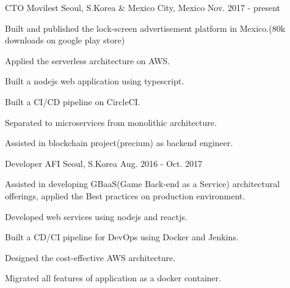 

\begin{cventries}

  \cventry
    {CTO} %
    {Movilest} %
    {Seoul, S.Korea \& Mexico City, Mexico} %
    {Nov. 2017 - present} %
    {
      \begin{cvitems} %
        \item {Built and published the lock-screen advertisement platform in Mexico.(80k downloads on google play store)}
        \item {Applied the serverless architecture on AWS.}
        \item {Built a nodejs web application using typescript.}
        \item {Built a CI/CD pipeline on CircleCI.}
        \item {Separated to microservices from monolithic architecture.}
        \item {Assisted in blockchain project(precium) as backend engineer.}
      \end{cvitems}
    }

  \cventry
    {Developer} %
    {AFI} %
    {Seoul, S.Korea} %
    {Aug. 2016 - Oct. 2017} %
    {
      \begin{cvitems} %
        \item {Assisted in developing GBaaS(Game Back-end as a Service) architectural offerings, applied the Best practices on production environment.}
        \item {Developed web services using nodejs and reactjs.}
        \item {Built a CD/CI pipeline for DevOps using Docker and Jenkins.}
        \item {Designed the cost-effective AWS architecture.}
        \item {Migrated all features of application as a docker container.}
      \end{cvitems}
    }

\end{cventries}
